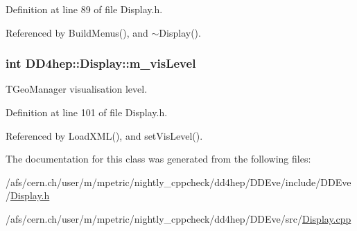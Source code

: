 Definition at line 89 of file Display.h.

Referenced by BuildMenus(), and $\sim$Display().\hypertarget{class_d_d4hep_1_1_display_a1e2bb859df3df7dc1bbc6447094e8f66}{
\subsubsection[{m\_\-visLevel}]{\setlength{\rightskip}{0pt plus 5cm}int {\bf DD4hep::Display::m\_\-visLevel}}}
\label{class_d_d4hep_1_1_display_a1e2bb859df3df7dc1bbc6447094e8f66}


TGeoManager visualisation level. 

Definition at line 101 of file Display.h.

Referenced by LoadXML(), and setVisLevel().

The documentation for this class was generated from the following files:\begin{DoxyCompactItemize}
\item 
/afs/cern.ch/user/m/mpetric/nightly\_\-cppcheck/dd4hep/DDEve/include/DDEve/\hyperlink{_display_8h}{Display.h}\item 
/afs/cern.ch/user/m/mpetric/nightly\_\-cppcheck/dd4hep/DDEve/src/\hyperlink{_display_8cpp}{Display.cpp}\end{DoxyCompactItemize}
